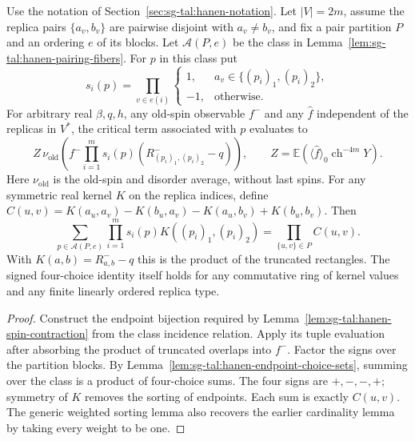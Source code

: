\begin{lemma}\label{lem:sg-tal:hanen-fiber-evaluation}
\leanok
{}
Use the notation of Section~\ref{sec:sg-tal:hanen-notation}.
Let $|V|=2m$, assume the replica pairs $\{a_v,b_v\}$ are pairwise disjoint
with $a_v\ne b_v$, and fix a pair partition $P$ and an ordering $e$ of its blocks.
Let $\mathcal A(P,e)$ be the class in
Lemma~\ref{lem:sg-tal:hanen-pairing-fibers}. For $p$ in this class put
\[
 s_i(p)=\prod_{v\in e(i)}
  \begin{cases}1,&a_v\in\{(p_i)_1,(p_i)_2\},\\-1,&\text{otherwise}.
  \end{cases}
\]
For arbitrary real $\beta,q,h$, any old-spin observable $f^-$ and any
$\hat f$ independent of the replicas in $V^*$, the critical term associated
with $p$ evaluates to
\[
 Z\,\nu_{\mathrm{old}}\left(f^-\prod_{i=1}^m
       s_i(p)(R^-_{(p_i)_1,(p_i)_2}-q)\right),
 \qquad Z=\mathbb E\left(\langle\hat f\rangle_0\operatorname{ch}^{-4m}Y\right).
\]
Here $\nu_{\mathrm{old}}$ is the old-spin and disorder average, without last spins.
For any symmetric real kernel $K$ on the replica indices, define
$C(u,v)=K(a_u,a_v)-K(b_u,a_v)-K(a_u,b_v)+K(b_u,b_v)$. Then
\[
 \sum_{p\in\mathcal A(P,e)}\prod_{i=1}^m s_i(p)K((p_i)_1,(p_i)_2)
   =\prod_{\{u,v\}\in P}C(u,v).
\]
With $K(a,b)=R^-_{a,b}-q$ this is the product of the truncated rectangles.
The signed four-choice identity itself holds for any commutative ring of kernel
values and any finite linearly ordered replica type.
\end{lemma}
\begin{proof}
\leanok
Construct the endpoint bijection required by
Lemma~\ref{lem:sg-tal:hanen-spin-contraction} from the class incidence relation.
Apply its tuple evaluation after absorbing the product of truncated overlaps
into $f^-$. Factor the signs over the partition blocks. By
Lemma~\ref{lem:sg-tal:hanen-endpoint-choice-sets}, summing over the class is a
product of four-choice sums. The four signs are $+,-,-,+$; symmetry of $K$
removes the sorting of endpoints. Each sum is exactly $C(u,v)$.
The generic weighted sorting lemma also recovers the earlier cardinality
lemma by taking every weight to be one.
\end{proof}

